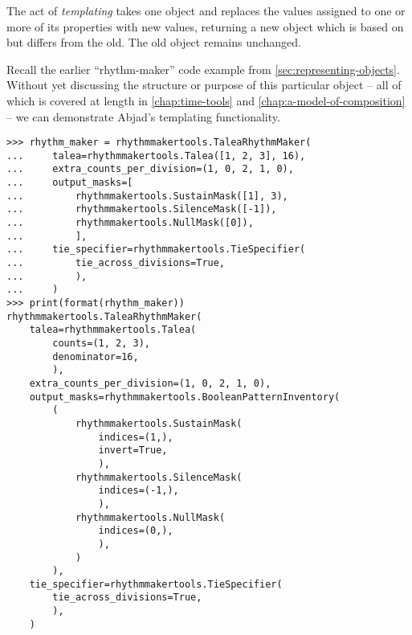 The act of \emph{templating} takes one object and replaces the values assigned
to one or more of its properties with new values, returning a new object which
is based on but differs from the old. The old object remains unchanged.

Recall the earlier \enquote{rhythm-maker} code example from
\autoref{sec:representing-objects}. Without yet discussing the structure or
purpose of this particular object -- all of which is covered at length in
\autoref{chap:time-tools} and \autoref{chap:a-model-of-composition} -- we can
demonstrate Abjad's templating functionality.

\begin{comment}
<abjad>
rhythm_maker = rhythmmakertools.TaleaRhythmMaker(
    talea=rhythmmakertools.Talea([1, 2, 3], 16),
    extra_counts_per_division=(1, 0, 2, 1, 0),
    output_masks=[
        rhythmmakertools.SustainMask([1], 3),
        rhythmmakertools.SilenceMask([-1]),
        rhythmmakertools.NullMask([0]),
        ],
    tie_specifier=rhythmmakertools.TieSpecifier(
        tie_across_divisions=True,
        ),
    )
print(format(rhythm_maker))
</abjad>
\end{comment}

\begin{abjadbookoutput}
\begin{singlespacing}
\vspace{-0.5\baselineskip}
\begin{lstlisting}
>>> rhythm_maker = rhythmmakertools.TaleaRhythmMaker(
...     talea=rhythmmakertools.Talea([1, 2, 3], 16),
...     extra_counts_per_division=(1, 0, 2, 1, 0),
...     output_masks=[
...         rhythmmakertools.SustainMask([1], 3),
...         rhythmmakertools.SilenceMask([-1]),
...         rhythmmakertools.NullMask([0]),
...         ],
...     tie_specifier=rhythmmakertools.TieSpecifier(
...         tie_across_divisions=True,
...         ),
...     )
>>> print(format(rhythm_maker))
rhythmmakertools.TaleaRhythmMaker(
    talea=rhythmmakertools.Talea(
        counts=(1, 2, 3),
        denominator=16,
        ),
    extra_counts_per_division=(1, 0, 2, 1, 0),
    output_masks=rhythmmakertools.BooleanPatternInventory(
        (
            rhythmmakertools.SustainMask(
                indices=(1,),
                invert=True,
                ),
            rhythmmakertools.SilenceMask(
                indices=(-1,),
                ),
            rhythmmakertools.NullMask(
                indices=(0,),
                ),
            )
        ),
    tie_specifier=rhythmmakertools.TieSpecifier(
        tie_across_divisions=True,
        ),
    )
\end{lstlisting}
\end{singlespacing}
\end{abjadbookoutput}

